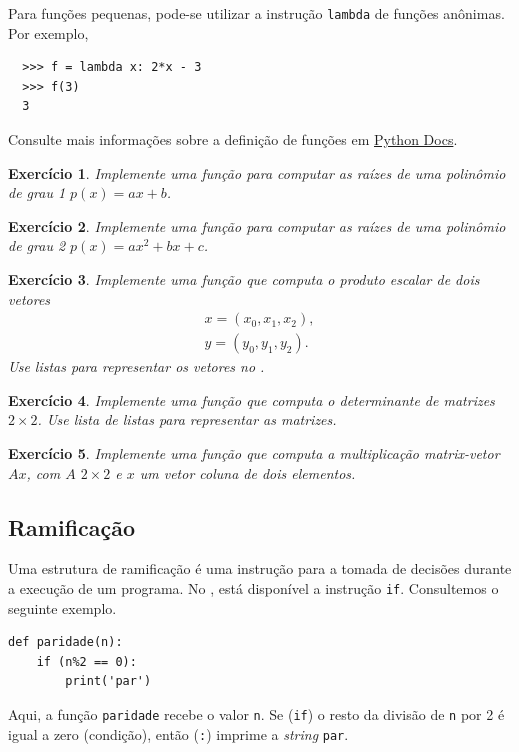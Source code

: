 \documentclass[12pt]{article}
\newtheorem{exr}{Exercício}[section]
\begin{document}
\begin{obs}
  Para funções pequenas, pode-se utilizar a instrução \lstinline+lambda+ de funções anônimas. Por exemplo,
  \begin{lstlisting}
  >>> f = lambda x: 2*x - 3
  >>> f(3)
  3
  \end{lstlisting}
\end{obs}

\begin{obs}
  Consulte mais informações sobre a definição de funções em \href{https://docs.python.org/3/tutorial/controlflow.html#defining-functions}{Python Docs}.
\end{obs}

\begin{exr}
  Implemente uma função para computar as raízes de uma polinômio de grau 1 $p(x) = ax + b$.
\end{exr}

\begin{exr}
  Implemente uma função para computar as raízes de uma polinômio de grau 2 $p(x) = ax^2 + bx + c$.
\end{exr}

\begin{exr}
  Implemente uma função que computa o produto escalar de dois vetores
  \begin{gather}
    x = (x_0, x_1, x_2),\\
    y = (y_0, y_1, y_2).
  \end{gather}
  Use listas para representar os vetores no {\python}.
\end{exr}

\begin{exr}
  Implemente uma função que computa o determinante de matrizes $2\times 2$. Use lista de listas para representar as matrizes.
\end{exr}

\begin{exr}
  Implemente uma função que computa a multiplicação matrix-vetor $Ax$, com $A$ $2\times 2$ e $x$ um vetor coluna de dois elementos.
\end{exr}

\subsection{Ramificação}

Uma estrutura de ramificação é uma instrução para a tomada de decisões durante a execução de um programa. No {\python}, está disponível a instrução \lstinline+if+. Consultemos o seguinte exemplo.
\begin{lstlisting}
def paridade(n):
    if (n%2 == 0):
        print('par')
\end{lstlisting}
Aqui, a função \lstinline+paridade+ recebe o valor \lstinline+n+. Se (\lstinline+if+) o resto da divisão de \lstinline+n+ por 2 é igual a zero (condição), então (\lstinline+:+) imprime a {\it string} \lstinline+par+.
\end{document}
